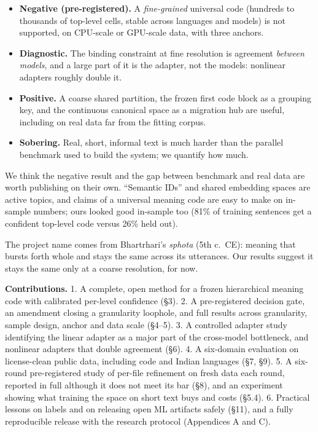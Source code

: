 \documentclass[
  10pt,
]{article}
\providecommand{\tightlist}{%
  \setlength{\itemsep}{0pt}\setlength{\parskip}{0pt}}
\begin{document}
\begin{itemize}
\tightlist
\item
  \textbf{Negative (pre-registered).} A \emph{fine-grained} universal
  code (hundreds to thousands of top-level cells, stable across
  languages and models) is not supported, on CPU-scale or GPU-scale
  data, with three anchors.
\item
  \textbf{Diagnostic.} The binding constraint at fine resolution is
  agreement \emph{between models}, and a large part of it is the
  adapter, not the models: nonlinear adapters roughly double it.
\item
  \textbf{Positive.} A coarse shared partition, the frozen first code
  block as a grouping key, and the continuous canonical space as a
  migration hub are useful, including on real data far from the fitting
  corpus.
\item
  \textbf{Sobering.} Real, short, informal text is much harder than the
  parallel benchmark used to build the system; we quantify how much.
\end{itemize}

We think the negative result and the gap between benchmark and real data
are worth publishing on their own. ``Semantic IDs'' and shared embedding
spaces are active topics, and claims of a universal meaning code are
easy to make on in-sample numbers; ours looked good in-sample too (81\%
of training sentences get a confident top-level code versus 26\% held
out).

The project name comes from Bhartrhari's \emph{sphota} (5th c.~CE):
meaning that bursts forth whole and stays the same across its
utterances. Our results suggest it stays the same only at a coarse
resolution, for now.

\textbf{Contributions.} 1. A complete, open method for a frozen
hierarchical meaning code with calibrated per-level confidence (\S{}3). 2.
A pre-registered decision gate, an amendment closing a granularity
loophole, and full results across granularity, sample design, anchor and
data scale (\S{}4--5). 3. A controlled adapter study identifying the linear
adapter as a major part of the cross-model bottleneck, and nonlinear
adapters that double agreement (\S{}6). 4. A six-domain evaluation on
license-clean public data, including code and Indian languages (\S{}7, \S{}9).
5. A six-round pre-registered study of per-file refinement on fresh data
each round, reported in full although it does not meet its bar (\S{}8), and
an experiment showing what training the space on short text buys and
costs (\S{}5.4). 6. Practical lessons on labels and on releasing open ML
artifacts safely (\S{}11), and a fully reproducible release with the
research protocol (Appendices A and C).
\end{document}

